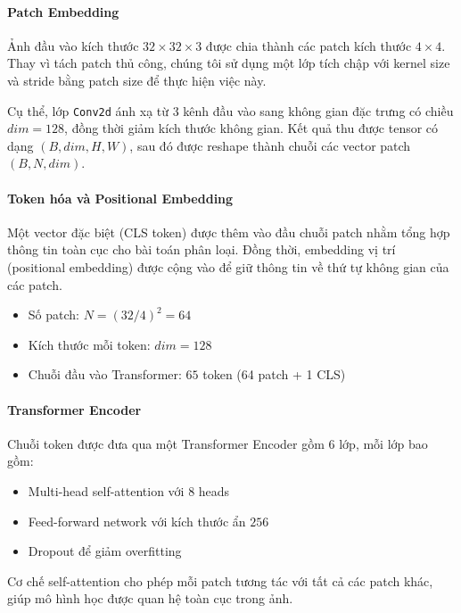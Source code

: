 \paragraph{Patch Embedding}

Ảnh đầu vào kích thước $32 \times 32 \times 3$ được chia thành các patch kích thước $4 \times 4$. Thay vì tách patch thủ công, chúng tôi sử dụng một lớp tích chập với kernel size và stride bằng patch size để thực hiện việc này.

Cụ thể, lớp \texttt{Conv2d} ánh xạ từ 3 kênh đầu vào sang không gian đặc trưng có chiều $dim = 128$, đồng thời giảm kích thước không gian. Kết quả thu được tensor có dạng $(B, dim, H, W)$, sau đó được reshape thành chuỗi các vector patch $(B, N, dim)$.

\paragraph{Token hóa và Positional Embedding}

Một vector đặc biệt (CLS token) được thêm vào đầu chuỗi patch nhằm tổng hợp thông tin toàn cục cho bài toán phân loại. Đồng thời, embedding vị trí (positional embedding) được cộng vào để giữ thông tin về thứ tự không gian của các patch.

\begin{itemize}
\item Số patch: $N = (32 / 4)^2 = 64$
\item Kích thước mỗi token: $dim = 128$
\item Chuỗi đầu vào Transformer: $65$ token (64 patch + 1 CLS)
\end{itemize}

\paragraph{Transformer Encoder}

Chuỗi token được đưa qua một Transformer Encoder gồm $6$ lớp, mỗi lớp bao gồm:
\begin{itemize}
\item Multi-head self-attention với $8$ heads
\item Feed-forward network với kích thước ẩn $256$
\item Dropout để giảm overfitting
\end{itemize}

Cơ chế self-attention cho phép mỗi patch tương tác với tất cả các patch khác, giúp mô hình học được quan hệ toàn cục trong ảnh.

